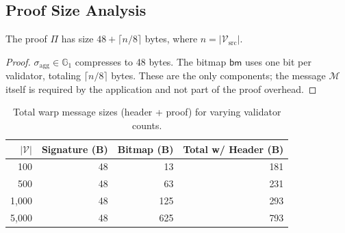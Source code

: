 \subsection{Proof Size Analysis}

\begin{proposition}\label{prop:proofsize}
The proof $\Pi$ has size $48 + \lceil n/8 \rceil$ bytes, where $n = |\mathcal{V}_{\text{src}}|$.
\end{proposition}

\begin{proof}
$\sigma_{\text{agg}} \in \mathbb{G}_1$ compresses to 48 bytes. The bitmap $\mathsf{bm}$ uses one bit per validator, totaling $\lceil n/8 \rceil$ bytes. These are the only components; the message $\mathcal{M}$ itself is required by the application and not part of the proof overhead.
\end{proof}

\begin{table}[H]
\centering
\caption{Total warp message sizes (header + proof) for varying validator counts.}
\label{tab:proofsize}
\begin{tabular}{rrrr}
\toprule
\textbf{$|\mathcal{V}|$} & \textbf{Signature (B)} & \textbf{Bitmap (B)} & \textbf{Total w/ Header (B)} \\
\midrule
100 & 48 & 13 & 181 \\
500 & 48 & 63 & 231 \\
1{,}000 & 48 & 125 & 293 \\
5{,}000 & 48 & 625 & 793 \\
\bottomrule
\end{tabular}
\end{table}

